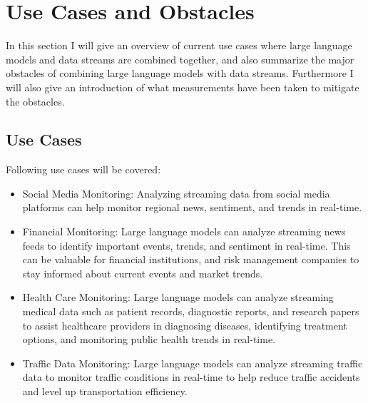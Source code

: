 \documentclass[runningheads]{llncs}
\begin{document}
\section{Use Cases and Obstacles}
In this section I will give an overview of current use cases where large language models and data streams are combined together, and also summarize the major obstacles of combining large language models with data streams. Furthermore I will also give an introduction of what measurements have been taken to mitigate the obstacles. 
\subsection{Use Cases}
Following use cases will be covered:
\begin{itemize}
    \item Social Media Monitoring: Analyzing streaming data from social media platforms can help monitor regional news, sentiment, and trends in real-time.
    \item Financial Monitoring:  Large language models can analyze streaming news feeds to identify important events, trends, and sentiment in real-time. This can be valuable for financial institutions, and risk management companies to stay informed about current events and market trends.
    \item Health Care Monitoring: Large language models can analyze streaming medical data such as patient records, diagnostic reports, and research papers to assist healthcare providers in diagnosing diseases, identifying treatment options, and monitoring public health trends in real-time.
    \item Traffic Data Monitoring: Large language models can analyze streaming traffic data to monitor traffic conditions in real-time to help reduce traffic accidents and level up transportation efficiency. 
\end{itemize}
\end{document}
